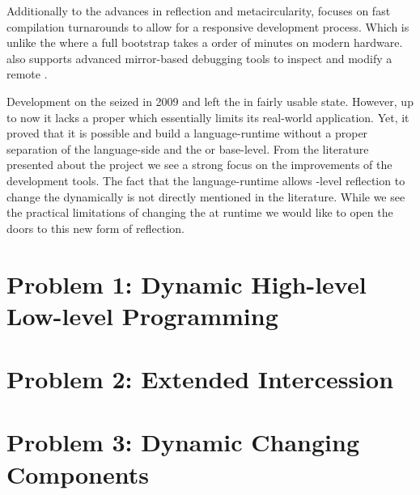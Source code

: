 Additionally to the advances in reflection and metacircularity, \Klein focuses on fast compilation turnarounds to allow for a responsive development process.
Which is unlike the \Squeak \VM where a full \VM bootstrap takes a order of minutes on modern hardware.
\Klein also supports advanced mirror-based debugging tools to inspect and modify a remote \VM.

Development on the \Klein \VM seized in 2009 and left the \Klein \VM in fairly usable state.
However, up to now it lacks a proper \GC which essentially limits its real-world application.
Yet, it proved that it is possible and build a language-runtime without a proper separation of the language-side and the \VM or base-level.
From the literature presented about the \Klein project we see a strong focus on the improvements of the development tools.
The fact that the language-runtime allows \VM-level reflection to change the \VM dynamically is not directly mentioned in the literature.
While we see the practical limitations of changing the \VM at runtime we would like to open the doors to this new form of reflection.


\section{Problem 1: Dynamic High-level Low-level Programming}

\section{Problem 2: Extended Intercession}


\section{Problem 3: Dynamic Changing \VM Components}


